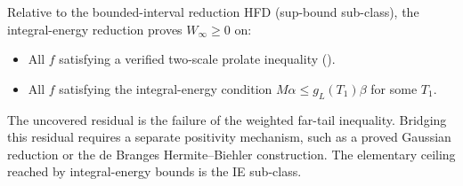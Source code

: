 \begin{remark}
\label{v4-arith:w7-e:rem:quantification}
Relative to the bounded-interval reduction HFD (sup-bound sub-class), the integral-energy reduction proves
\(W_{\infty}\ge0\) on:
\begin{itemize}
\item All \(f\) satisfying a verified two-scale prolate inequality
().
\item All \(f\) satisfying the integral-energy condition
\(M\alpha\leq g_{L}(T_{1})\beta\) for some \(T_{1}\).
\end{itemize}
The uncovered residual is the failure of the weighted far-tail
inequality. Bridging this residual requires a separate positivity
mechanism, such as a proved Gaussian reduction or the de Branges
Hermite--Biehler construction. The elementary ceiling reached by
integral-energy bounds is the IE sub-class.
\end{remark}
